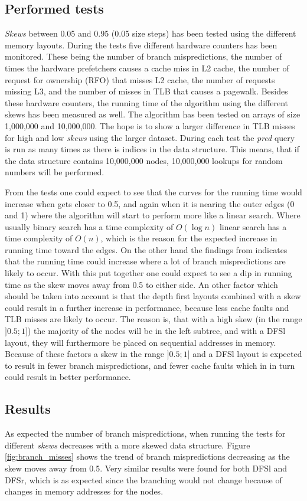 \documentclass{article}
\begin{document}
\subsection{Performed tests}
\textit{Skews} between 0.05 and 0.95 (0.05 size steps) has been tested using the different memory layouts. During the tests five different hardware counters has been monitored. These being the number of branch mispredictions, the number of times the hardware prefetchers causes a cache miss in L2 cache, the number of request for ownership (RFO) that misses L2 cache, the number of requests missing L3, and the number of misses in TLB that causes a pagewalk.
Besides these hardware counters, the running time of the algorithm using the different skews has been measured as well.
The algorithm has been tested on arrays of size 1,000,000 and 10,000,000. The hope is to show a larger difference in TLB misses for high and low \textit{skews} using the larger dataset. During each test the \textit{pred} query is run as many times as there is indices in the data structure. This means, that if the data structure contains 10,000,000 nodes, 10,000,000 lookups for random numbers will be performed. 

From the tests one could expect to see that the curves for the running time would increase when gets closer to 0.5, and again when it is nearing the outer edges (0 and 1) where the algorithm will start to perform more like a linear search. Where usually binary search has a time complexity of $O(\log n)$ linear search has a time complexity of $O(n)$, which is the reason for the expected increase in running time toward the edges. On the other hand the findings from %
indicates that the running time could increase where a lot of branch mispredictions are likely to occur. With this put together one could expect to see a dip in running time as the skew moves away from 0.5 to either side. An other factor which should be taken into account is that the depth first layouts combined with a skew could result in a further increase in performance, because less cache faults and TLB misses are likely to occur. The reason is, that with a high skew (in the range $]0.5;1]$) the majority of the nodes will be in the left subtree, and with a DFSl layout, they will furthermore be placed on sequential addresses in memory. Because of these factors a skew in the range $]0.5;1]$ and a DFSl layout is expected to result in fewer branch mispredictions, and fewer cache faults which in in turn could result in better performance.

\subsection{Results}
As expected the number of branch mispredictions, when running the tests for different \textit{skews} decreases with a more skewed data structure. Figure \ref{fig:branch_misses} shows the trend of branch mispredictions decreasing as the skew moves away from 0.5. Very similar results were found for both DFSl and DFSr, which is as expected since the branching would not change because of changes in memory addresses for the nodes.
\end{document}
